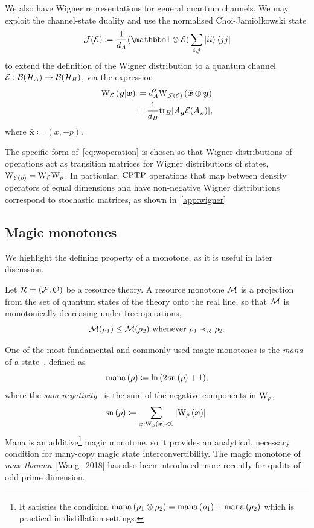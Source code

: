 \documentclass[pra,
aps,
twocolumn,
superscriptaddress,
groupedaddress,
nofootinbib,
reprint
]{revtex4-1}
\begin{document}
We also have Wigner representations for general quantum channels. We may exploit the channel-state duality and use the normalised Choi-Jamio\l{}kowski state 
\begin{equation}\label{eq:cj}
  \J(\E) \coloneqq \frac{1}{d_A}(\id \otimes \E) \sum_{i,j} \ket{ii}\bra{jj}
\end{equation}
to extend the definition of the Wigner distribution to a quantum channel $\mathcal{E}: {\mathcal B}({\mathcal H}_A) \rightarrow {\mathcal B}({\mathcal H}_B)$, via the expression
\begin{align}\label{eq:woperation}
    \W[\bmy|\bmx]{\E} 
    &\coloneqq d_A^2 \W[\bm{\bar x} \oplus \bmy]{\J(\E)} \\
    &= \frac{1}{d_B} \tr_B[A_{\bmy} \E(A_{\bmx})],
\end{align}
where $\bm{\bar x} \coloneqq (x, -p)$.

The specific form of~\cref{eq:woperation} is chosen so that Wigner distributions of operations act as transition matrices for Wigner distributions of states, $\W{\E(\rho)} = \W{\E}\W{\rho}$.
In particular, ${\rm{CPTP}}$ operations that map between density operators of equal dimensions and have non-negative Wigner distributions correspond to stochastic matrices, as shown in~\cref{app:wigner}

\subsection{Magic monotones}
\label{sec:mono}

We highlight the defining property of a monotone, as it is useful in later discussion.
\begin{definition}\label{def:mono}
    Let $\mathcal{R} = (\mathcal{F}, \mathcal{O})$ be a resource theory.
    A resource monotone $\mathcal{M}$ is a projection from the set of quantum states of the theory onto the real line, so that $\mathcal{M}$ is monotonically decreasing under free operations,
    \begin{equation}
        \mathcal{M}(\rho_1) \leq \mathcal{M}(\rho_2)\ \text{whenever}\ \rho_1 \prec_{\mathcal{R}} \rho_2.
    \end{equation}
\end{definition}

One of the most fundamental and commonly used magic monotones is the \emph{mana} of a state~\cite{cit:veitch2}, defined as
\begin{equation}
    {{\rm{mana}}\left(\rho\right)} \coloneqq \ln{(2\hspace{1pt} {{\rm{sn}}\left(\rho\right)} +1)},
\end{equation}
where the \emph{sum-negativity}~\cite{cit:veitch2} is the sum of the negative components in $\W{\rho}$,
\begin{equation}
    \sn{\rho} \coloneqq \sum\limits_{\bmx: \W[\bmx]{\rho} < 0} \abs{\W[\bmx]{\rho}}.
\end{equation}
Mana is an additive\footnote{It satisfies the condition ${{\rm{mana}}\left(\rho_1 \otimes \rho_2\right)} = {{\rm{mana}}\left(\rho_1\right)} + {{\rm{mana}}\left(\rho_2\right)}$ which is practical in distillation settings.} magic monotone, so it provides an analytical, necessary condition for many-copy magic state interconvertibility.
The magic monotone of \emph{max--thauma}~\cref{Wang_2018} has also been introduced more recently for qudits of odd prime dimension.
\end{document}
